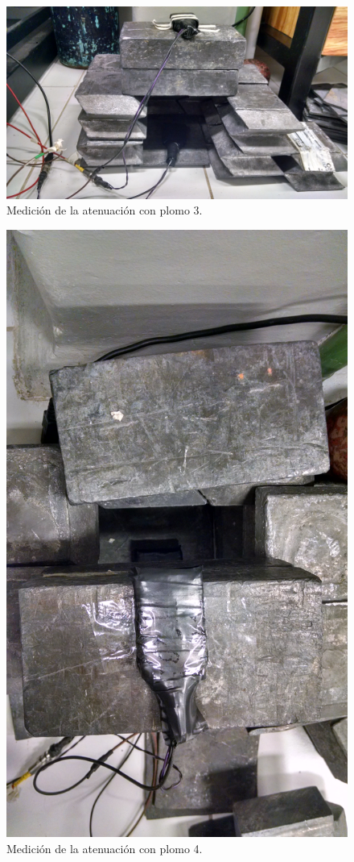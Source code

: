 \documentclass[a4paper,10pt]{article}
\numberwithin{equation}{section}
\begin{document}
\begin{figure}[H]
 \center 
 \includegraphics[scale=0.08]{Imagenes/plomo3}
 \caption{Medición de la atenuación con  plomo 3.}
\end{figure}

\begin{figure}[H]
 \center 
 \includegraphics[scale=0.08]{Imagenes/plomo4}
 \caption{Medición de la atenuación con  plomo 4.}
\end{figure}
\end{document}
